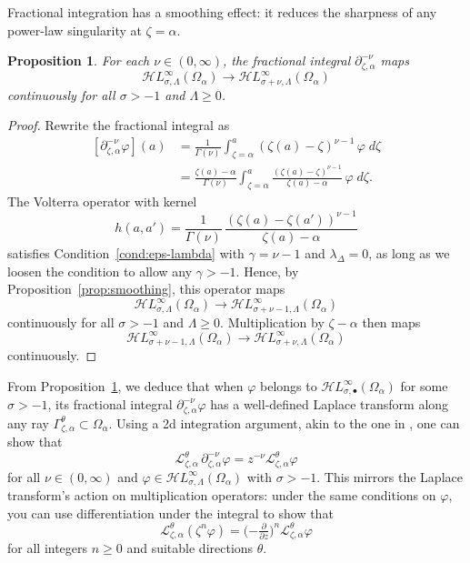 \documentclass{article}
\theoremstyle{definition}
\theoremstyle{plain}
\newtheorem{prop}{Proposition}
\newcommand{\laplace}{\mathcal{L}}
\newcommand{\fracderiv}[3]{\partial^{#1}_{#2, #3}}
\newcommand{\singexp}[2]{\mathcal{H}L^\infty_{#1, #2}}
\newcommand{\singexpalg}[1]{\singexp{#1}{\bullet}}
\newcommand{\domain}{\Omega}
\begin{document}
Fractional integration has a smoothing effect: it reduces the sharpness of any power-law singularity at $\zeta = \alpha$.
\begin{prop}\label{prop:frac-int-smoothing}
For each $\nu \in (0, \infty)$, the fractional integral $\fracderiv{-\nu}{\zeta}{\alpha}$ maps
\[ \singexp{\sigma}{\Lambda}(\domain_\alpha) \to \singexp{\sigma+\nu}{\Lambda}(\domain_\alpha) \]
continuously for all $\sigma > -1$ and $\Lambda \ge 0$.
\end{prop}
\begin{proof}
Rewrite the fractional integral as
\begin{align*}
\left[\fracderiv{-\nu}{\zeta}{\alpha} \varphi\right](a)&=\frac{1}{\Gamma(\nu)}\int_{\zeta=\alpha}^a (\zeta(a)-\zeta)^{\nu-1} \, \varphi \; d\zeta\\
&=\frac{\zeta(a)-\alpha}{\Gamma(\nu)}\int_{\zeta=\alpha}^a \frac{(\zeta(a)-\zeta)^{\nu-1}}{\zeta(a)- \alpha}\,\varphi \; d\zeta.
\end{align*}
The Volterra operator with kernel
\[ h(a, a') = \frac{1}{\Gamma(\nu)}\,\frac{(\zeta(a)-\zeta(a'))^{\nu-1}}{\zeta(a)- \alpha} \]
satisfies Condition~\eqref{cond:eps-lambda} with $\gamma=\nu-1$ and $\lambda_\Delta=0$, as long as we loosen the condition to allow any $\gamma > -1$. Hence, by Proposition~\ref{prop:smoothing}, this operator maps
\[ \singexp{\sigma}{\Lambda}(\domain_\alpha) \to \singexp{\sigma+\nu-1}{\Lambda}(\domain_\alpha) \]
continuously for all $\sigma > -1$ and $\Lambda \ge 0$. Multiplication by $\zeta - \alpha$ then maps
\[ \singexp{\sigma+\nu-1}{\Lambda}(\domain_\alpha) \to \singexp{\sigma+\nu}{\Lambda}(\domain_\alpha) \]
continuously.
\end{proof}

From Proposition~\ref{prop:frac-int-smoothing}, we deduce that when $\varphi$ belongs to $\singexpalg{\sigma}(\domain_\alpha)$ for some $\sigma > -1$, its fractional integral $\fracderiv{-\nu}{\zeta}{\alpha}\varphi$ has a well-defined Laplace transform along any ray $\Gamma_{\zeta,\alpha}^{\theta}\subset\domain_\alpha$. Using a 2d integration argument, akin to the one in \cite[Theorem~2.39]{laplace-tfm}, one can show that 
\[ \laplace_{\zeta,\alpha}^{\theta}\,\fracderiv{-\nu}{\zeta}{\alpha} \varphi = z^{-\nu} \laplace_{\zeta, \alpha}^{\theta} \varphi \]
for all $\nu \in (0, \infty)$ and $\varphi\in\singexp{\sigma}{\Lambda}(\domain_\alpha)$ with $\sigma>-1$. This mirrors the Laplace transform's action on multiplication operators: under the same conditions on $\varphi$, you can use differentiation under the integral to show that~\cite[Theorem~1.34]{laplace-tfm}
\[ \laplace_{\zeta,\alpha}^\theta (\zeta^n \varphi) = \big({-\tfrac{\partial}{\partial z}}\big)^n \laplace_{\zeta,\alpha}^\theta \varphi \]
for all integers $n \ge 0$ and suitable directions $\theta$.
\end{document}
